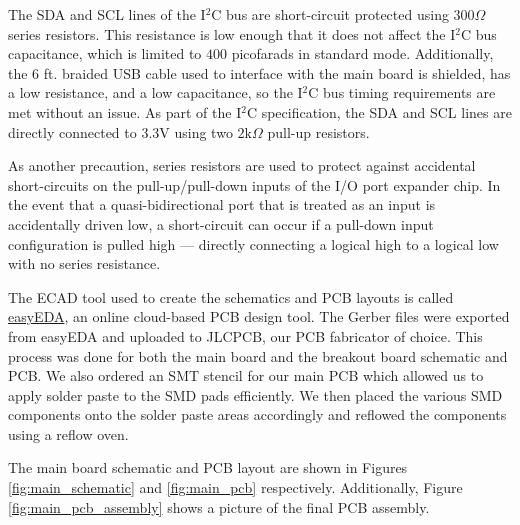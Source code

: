 \documentclass[conference]{IEEEtran}
\begin{document}
The SDA and SCL lines of the I$^2$C bus are short-circuit protected using $300 \Omega$ series resistors. This resistance is low enough that it does not affect the I$^2$C bus capacitance, which is limited to $400$ picofarads in standard mode. Additionally, the 6 ft. braided USB cable used to interface with the main board is shielded, has a low resistance, and a low capacitance, so the I$^2$C bus timing requirements are met without an issue. As part of the I$^2$C specification, the SDA and SCL lines are directly connected to 3.3V using two $2 \text{k}\Omega$ pull-up resistors.

As another precaution, series resistors are used to protect against accidental short-circuits on the pull-up/pull-down inputs of the I/O port expander chip. In the event that a quasi-bidirectional port that is treated as an input is accidentally driven low, a short-circuit can occur if a pull-down input configuration is pulled high --- directly connecting a logical high to a logical low with no series resistance.

The ECAD tool used to create the schematics and PCB layouts is called \href{https://easyeda.com}{easyEDA}, an online cloud-based PCB design tool. The Gerber files were exported from easyEDA and uploaded to JLCPCB, our PCB fabricator of choice. This process was done for both the main board and the breakout board schematic and PCB. We also ordered an SMT stencil for our main PCB which allowed us to apply solder paste to the SMD pads efficiently. We then placed the various SMD components onto the solder paste areas accordingly and reflowed the components using a reflow oven.

The main board schematic and PCB layout are shown in Figures \ref{fig:main_schematic} and \ref{fig:main_pcb} respectively. Additionally, Figure \ref{fig:main_pcb_assembly} shows a picture of the final PCB assembly.
\end{document}
